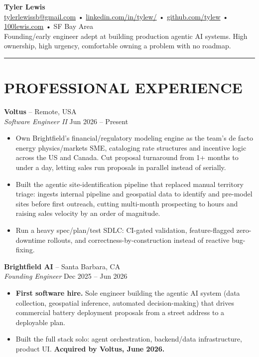 \documentclass[a4paper,10pt]{article}
\begin{document}
\begin{center}
\textbf{\Large Tyler Lewis}\\[4pt]
\href{mailto:tylerlewissb@gmail.com}{tylerlewissb@gmail.com} • \href{https://linkedin.com/in/tylew/}{linkedin.com/in/tylew/} • \href{https://github.com/tylew}{github.com/tylew} • \href{https://100lewis.com}{100lewis.com} • SF Bay Area\\[3pt]
Founding/early engineer adept at building production agentic AI systems. High ownership, high urgency, comfortable owning a problem with no roadmap.
\end{center}\vspace{-\baselineskip}

\noindent\rule{\textwidth}{0.4pt}

\section*{PROFESSIONAL EXPERIENCE}

\textbf{Voltus} – Remote, USA\\
\textit{Software Engineer II} \hfill Jun 2026 – Present
\begin{itemize}[leftmargin=1.5em]
\item Own Brightfield's financial/regulatory modeling engine as the team's de facto energy physics/markets SME, cataloging rate structures and incentive logic across the US and Canada. Cut proposal turnaround from 1+ months to under a day, letting sales run proposals in parallel instead of serially.
\item Built the agentic site-identification pipeline that replaced manual territory triage: ingests internal pipeline and geospatial data to identify and pre-model sites before first outreach, cutting multi-month prospecting to hours and raising sales velocity by an order of magnitude.
\item Run a heavy spec/plan/test SDLC: CI-gated validation, feature-flagged zero-downtime rollouts, and correctness-by-construction instead of reactive bug-fixing.
\end{itemize}

\textbf{Brightfield AI} – Santa Barbara, CA\\
\textit{Founding Engineer} \hfill Dec 2025 – Jun 2026
\begin{itemize}[leftmargin=1.5em]
\item \textbf{First software hire.} Sole engineer building the agentic AI system (data collection, geospatial inference, automated decision-making) that drives commercial battery deployment proposals from a street address to a deployable plan.
\item Built the full stack solo: agent orchestration, backend/data infrastructure, product UI. \textbf{Acquired by Voltus, June 2026.}
\end{itemize}
\end{document}
